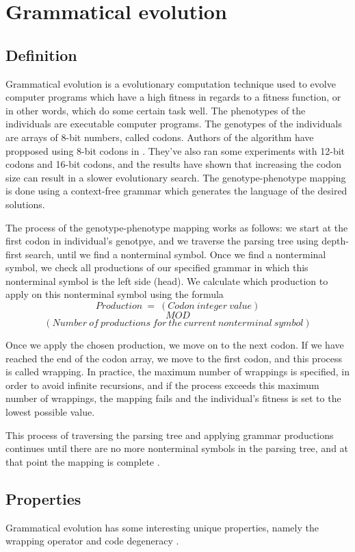 \section{Grammatical evolution}
\subsection{Definition}
Grammatical evolution is a evolutionary computation technique used to evolve computer programs which have a high fitness in regards to a fitness function, or in other words, which do some certain task well. The phenotypes of the individuals are executable computer programs. The genotypes of the individuals are arrays of 8-bit numbers, called codons. Authors of the algorithm have propposed using 8-bit codons in \citep{neill2003grammaticalevolution}. They've also ran some experiments with 12-bit codons and 16-bit codons, and the results have shown that increasing the codon size can result in a slower evolutionary search. The genotype-phenotype mapping is done using a context-free grammar which generates the language of the desired solutions.

The process of the genotype-phenotype mapping works as follows: we start at the first codon in individual's genotpye, and we traverse the parsing tree using depth-first search, until we find a nonterminal symbol. Once we find a nonterminal symbol, we check all productions of our specified grammar in which this nonterminal symbol is the left side (head). We calculate which production to apply on this nonterminal symbol using the formula
\newpage
$$Production\:=\:(Codon\:integer\:value)$$
$$MOD$$ 
$$(Number\:of\:productions\:for\:the\:current\:nonterminal\:symbol)$$ 

Once we apply the chosen production, we move on to the next codon. If we have reached the end of the codon array, we move to the first codon, and this process is called wrapping. In practice, the maximum number of wrappings is specified, in order to avoid infinite recursions, and if the process exceeds this maximum number of wrappings, the mapping fails and the individual's fitness is set to the lowest possible value.

This process of traversing the parsing tree and applying grammar productions continues until there are no more nonterminal symbols in the parsing tree, and at that point the mapping is complete \citep{neill2003grammaticalevolution}.

\subsection{Properties}
Grammatical evolution has some interesting unique properties, namely the wrapping operator and code degeneracy \citep{neill2003grammaticalevolution}. 

